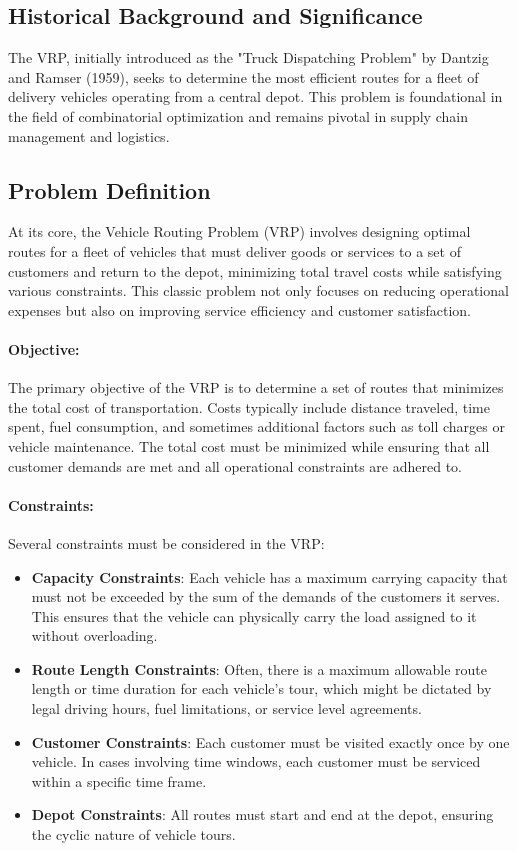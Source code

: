 \documentclass[
]{article}
\begin{document}
\subsection{Historical Background and Significance}
The VRP, initially introduced as the "Truck Dispatching Problem" by Dantzig and Ramser (1959), seeks to determine the most efficient routes for a fleet of delivery vehicles operating from a central depot. This problem is foundational in the field of combinatorial optimization and remains pivotal in supply chain management and logistics.

\subsection{Problem Definition}

At its core, the Vehicle Routing Problem (VRP) involves designing optimal routes for a fleet of vehicles that must deliver goods or services to a set of customers and return to the depot, minimizing total travel costs while satisfying various constraints. This classic problem not only focuses on reducing operational expenses but also on improving service efficiency and customer satisfaction.

\paragraph{Objective:}
The primary objective of the VRP is to determine a set of routes that minimizes the total cost of transportation. Costs typically include distance traveled, time spent, fuel consumption, and sometimes additional factors such as toll charges or vehicle maintenance. The total cost must be minimized while ensuring that all customer demands are met and all operational constraints are adhered to.

\paragraph{Constraints:}
Several constraints must be considered in the VRP:
\begin{itemize}
  \item \textbf{Capacity Constraints}: Each vehicle has a maximum carrying capacity that must not be exceeded by the sum of the demands of the customers it serves. This ensures that the vehicle can physically carry the load assigned to it without overloading.
  \item \textbf{Route Length Constraints}: Often, there is a maximum allowable route length or time duration for each vehicle's tour, which might be dictated by legal driving hours, fuel limitations, or service level agreements.
  \item \textbf{Customer Constraints}: Each customer must be visited exactly once by one vehicle. In cases involving time windows, each customer must be serviced within a specific time frame.
  \item \textbf{Depot Constraints}: All routes must start and end at the depot, ensuring the cyclic nature of vehicle tours.
\end{itemize}
\end{document}
